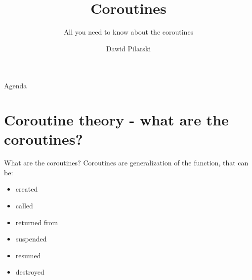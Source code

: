 \documentclass[10pt]{beamer}
\title{Coroutines}
\subtitle{All you need to know about the coroutines}
\date{}
\author{Dawid Pilarski}
\institute{dawid.pilarski@panicsoftware.com \\ blog.panicsoftware.com}
\begin{document}
\maketitle

\begin{frame}{Agenda}
\tableofcontents
\end{frame}

\section{Coroutine theory - what are the coroutines?}

\begin{frame}{What are the coroutines?}
\alert{Coroutines} are \alert{generalization} of the function, that can be:

\begin{itemize}[<+- |alert@+>]
\item created
\item called
\item returned from
\item suspended
\item resumed
\item destroyed
\end{itemize}

\end{frame}
\end{document}

